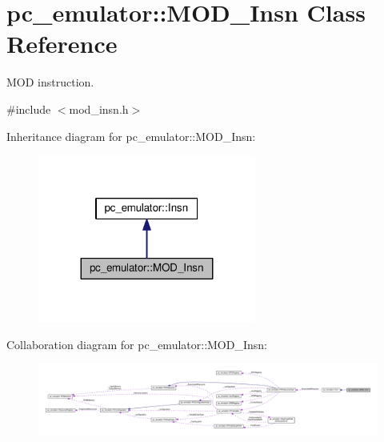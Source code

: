 \hypertarget{classpc__emulator_1_1MOD__Insn}{}\section{pc\+\_\+emulator\+:\+:M\+O\+D\+\_\+\+Insn Class Reference}
\label{classpc__emulator_1_1MOD__Insn}


M\+OD instruction.  




{\ttfamily \#include $<$mod\+\_\+insn.\+h$>$}



Inheritance diagram for pc\+\_\+emulator\+:\+:M\+O\+D\+\_\+\+Insn\+:
\nopagebreak
\begin{figure}[H]
\begin{center}
\leavevmode
\includegraphics[width=203pt]{classpc__emulator_1_1MOD__Insn__inherit__graph}
\end{center}
\end{figure}


Collaboration diagram for pc\+\_\+emulator\+:\+:M\+O\+D\+\_\+\+Insn\+:
\nopagebreak
\begin{figure}[H]
\begin{center}
\leavevmode
\includegraphics[width=350pt]{classpc__emulator_1_1MOD__Insn__coll__graph}
\end{center}
\end{figure}
